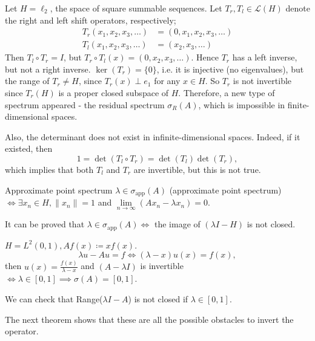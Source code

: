 \documentclass{report}
\begin{document}
\begin{example}{}{}
    Let \(H = \ell_{2}\), the space of square summable sequences. Let \(T_{r}, T_{l} \in \mathcal{L}(H)\) denote the right and left shift operators, respectively;
    \begin{align*}
        T_{r}(x_1, x_2, x_3, \dots) &= (0, x_1, x_2, x_3, \dots) \\
        T_{l}(x_1, x_2, x_3, \dots) &= (x_2, x_3, \dots)
    \end{align*}
    Then \(T_{l} \circ T_{r} = I\), but \(T_{r} \circ T_{l} (x) = (0, x_2, x_3, \dots)\). Hence \(T_{r}\) has a left inverse, but not a right inverse. \(\ker(T_{r}) = \{0\}\), i.e. it is injective (no eigenvalues), but the range of \(T_{r} \neq H\), since \(T_{r}(x) \perp e_{1}\) for any \(x \in H\). So \(T_{r}\) is not invertible since \(T_{r}(H)\) is a proper closed subspace of \(H\). Therefore, a new type of spectrum appeared - the residual spectrum \(\sigma_{R}(A)\), which is impossible in finite-dimensional spaces. 

    Also, the determinant does not exist in infinite-dimensional spaces. Indeed, if it existed, then
    \[
        1 = \det(T_{l} \circ T_{r}) = \det(T_{l})\det(T_{r}),
    \]
    which implies that both \(T_{l}\) and \(T_{r}\) are invertible, but this is not true.
\end{example}

\begin{definition}{Approximate point spectrum}{}
    \(\lambda \in \sigma_{\text{app}}(A)\) (approximate point spectrum) \(\iff \exists x_{n} \in H, \|x_{n}\| = 1\) and \(\lim\limits_{n \rightarrow \infty} (Ax_{n}-\lambda x_{n}) = 0\).

    It can be proved that \(\lambda \in \sigma_{\text{app}}(A) \iff \) the image of \((\lambda I - H)\) is not closed.
\end{definition}

\begin{example}{}{}
    \(H = L^{2}(0, 1), Af(x) \coloneqq xf(x)\).
    \[
        \lambda u - Au = f \iff (\lambda - x)u(x) = f(x),
    \]
    then \(u(x) = \frac{f(x)}{\lambda - x}\) and \((A - \lambda I)\) is invertible \(\iff \lambda \in [0, 1] \implies \sigma(A) = [0, 1]\).

    We can check that Range(\(\lambda I - A\)) is not closed if \(\lambda \in [0, 1]\).
\end{example}
The next theorem shows that these are all the possible obstacles to invert the operator.
\end{document}
